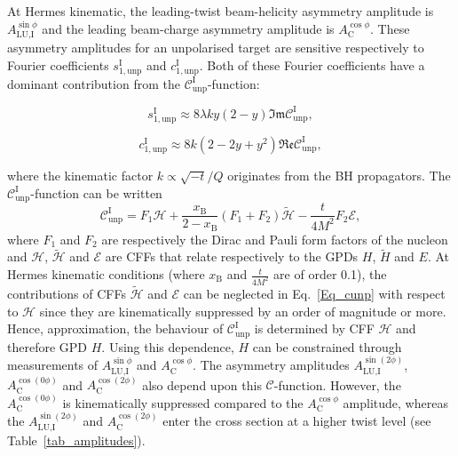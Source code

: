 At H{\sc ermes} kinematic, the leading-twist beam-helicity asymmetry amplitude is $A_{\textrm{LU,I}}^{\sin\phi}$ and the leading beam-charge asymmetry amplitude is $A^{\cos\phi}_{\textrm{C}}$. These asymmetry amplitudes for an unpolarised target are sensitive respectively to Fourier coefficients $s_{1,\textrm{unp}}^{\textrm{I}}$ and $c_{1,\textrm{unp}}^{\textrm{I}}$. Both of these Fourier coefficients have a dominant contribution from the $\mathcal{C}_{\textrm{unp}}^{\textrm{I}}$-function:
\begin{center}
\begin{equation}
 s_{1,\textrm{unp}}^{\textrm{I}} \approx 8\lambda ky(2-y)\mathfrak{Im}\mathcal{C}_{\textrm{unp}}^{\textrm{I}},
\label{eq:s1}
\end{equation}
\end{center}
\begin{center}
\begin{equation}
 c_{1,\textrm{unp}}^{\textrm{I}} \approx 8k(2- 2y + y^{2})\mathfrak{Re}\mathcal{C}_{\textrm{unp}}^{\textrm{I}},
\label{eq:c1}
\end{equation}
\end{center}
where the kinematic factor $k \propto \sqrt{-t}/Q$ originates from the BH
propagators. The $\mathcal{C}_{\textrm{unp}}^{\textrm{I}}$-function can be
written
\cite{Bel02b} 
\begin{equation}
 \mathcal{C}_{\textrm{unp}}^{\textrm{I}} = F_{1}\mathcal{H} + \frac{x_{\textrm{B}}}{2-x_{\textrm{B}}}(F_{1}+F_{2})\widetilde{\mathcal{H}} -\frac{t}{4M^{2}}F_{2}\mathcal{E},
\label{Eq_cunp}
\end{equation}
where $F_{1}$ and $F_{2}$ are respectively the Dirac and Pauli form
factors of the nucleon and $\mathcal{H}$, $\widetilde{\mathcal{H}}$ and
$\mathcal{E}$ are CFFs that relate respectively to the GPDs $H$,
$\widetilde{H}$ and $E$.  At H{\sc ermes} kinematic
conditions (where $x_{\textrm{B}}$ and $\frac{t}{4M^2}$ are of order 0.1),  the
contributions of CFFs $\widetilde{\mathcal{H}}$ and $\mathcal{E}$ can be
neglected in Eq.~\ref{Eq_cunp} with respect to $\mathcal{H}$ since they
are kinematically suppressed by an order of magnitude or more.
Hence,  approximation, the behaviour of
$\mathcal{C}_{\textrm{unp}}^{\textrm{I}}$ is determined by CFF $\mathcal{H}$
and therefore GPD $H$. Using this dependence, $H$ can be constrained through
measurements of $A_{\textrm{LU,I}}^{\sin\phi}$ and $A^{\cos\phi}_{\textrm{C}}$.
The asymmetry amplitudes $A_{\textrm{LU},\textrm{I}}^{\sin(2\phi)}$,
$A^{\cos(0\phi)}_{\textrm{C}}$ and $A^{\cos(2\phi)}_{\textrm{C}}$ also depend
upon this $\mathcal{C}$-function. However, the $A^{\cos(0\phi)}_{\textrm{C}}$  is kinematically suppressed compared to the $A^{\cos\phi}_{\textrm{C}}$ amplitude, whereas the  $A_{\textrm{LU,I}}^{\sin(2\phi)}$ and $A^{\cos(2\phi)}_{\textrm{C}}$  enter the cross section at a higher
twist level (see Table~\ref{tab_amplitudes}).

